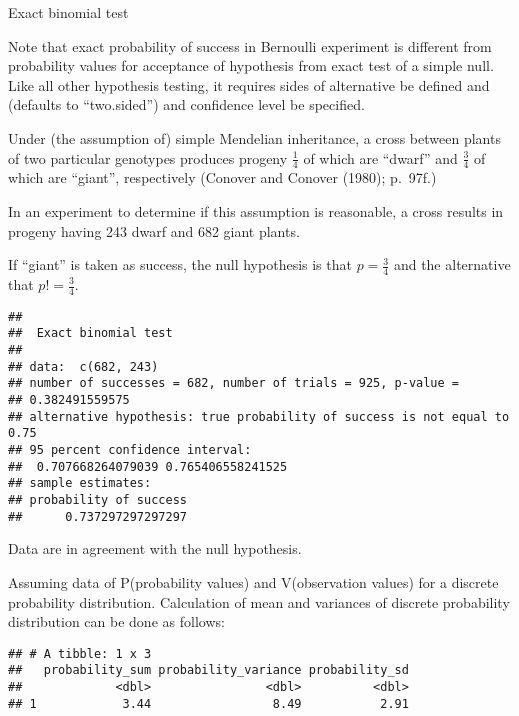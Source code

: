 \documentclass[ignorenonframetext,aspectratio=169]{beamer}
\begin{document}
\begin{frame}{Exact binomial test}
\protect\hypertarget{exact-binomial-test}{}

Note that exact probability of success in Bernoulli experiment is
different from probability values for acceptance of hypothesis from
exact test of a simple null. Like all other hypothesis testing, it
requires sides of alternative be defined and (defaults to ``two.sided'')
and confidence level be specified.

\end{frame}

\begin{frame}[fragile]{}
\protect\hypertarget{section-14}{}

\small

Under (the assumption of) simple Mendelian inheritance, a cross between
plants of two particular genotypes produces progeny \(\frac{1}{4}\) of
which are ``dwarf'' and \(\frac{3}{4}\) of which are ``giant'',
respectively (Conover and Conover (1980); p.~97f.)

In an experiment to determine if this assumption is reasonable, a cross
results in progeny having 243 dwarf and 682 giant plants.

If ``giant'' is taken as success, the null hypothesis is that
\(p = \frac{3}{4}\) and the alternative that \(p!= \frac{3}{4}\).

\begin{verbatim}
## 
##  Exact binomial test
## 
## data:  c(682, 243)
## number of successes = 682, number of trials = 925, p-value =
## 0.382491559575
## alternative hypothesis: true probability of success is not equal to 0.75
## 95 percent confidence interval:
##  0.707668264079039 0.765406558241525
## sample estimates:
## probability of success 
##      0.737297297297297
\end{verbatim}

Data are in agreement with the null hypothesis.

\end{frame}

\begin{frame}[fragile]{}
\protect\hypertarget{section-15}{}

Assuming data of P(probability values) and V(observation values) for a
discrete probability distribution. Calculation of mean and variances of
discrete probability distribution can be done as follows:

\begin{verbatim}
## # A tibble: 1 x 3
##   probability_sum probability_variance probability_sd
##             <dbl>                <dbl>          <dbl>
## 1            3.44                 8.49           2.91
\end{verbatim}

\end{frame}
\end{document}
